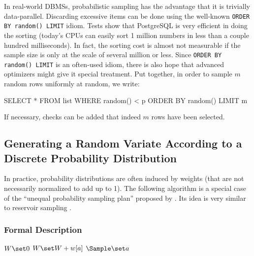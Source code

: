 In real-world DBMSs, probabilistic sampling has the advantage that it is trivially data-parallel. Discarding excessive items can be done using the well-known \texttt{ORDER BY random() LIMIT} idiom. Tests show that PostgreSQL is very efficient in doing the sorting (today's CPUs can easily sort 1 million numbers in less than a couple hundred milliseconds). In fact, the sorting cost is almost not measurable if the sample size is only at the scale of several million or less. Since \texttt{ORDER BY random() LIMIT} is an often-used idiom, there is also hope that advanced optimizers might give it special treatment. Put together, in order to sample $m$ random rows uniformly at random, we write:
\begin{sql}
	SELECT * FROM list WHERE random() < p ORDER BY random() LIMIT m
\end{sql}
If necessary, checks can be added that indeed $m$ rows have been selected.


\subsection{Generating a Random Variate According to a Discrete Probability Distribution}

In practice, probability distributions are often induced by weights (that are not necessarily normalized to add up to 1). The following algorithm is a special case of the ``unequal probability sampling plan'' proposed by \textcite{C82a}. Its idea is very similar to reservoir sampling \cite{MB83a}.

\subsubsection{Formal Description}

\begin{algorithm}[WeightedSample$(A, w)$] \label{alg:WeightedSample}
\begin{algorithmic}[1]
	\State $W \set 0$
		\State $W \set W + w[a]$ \label{alg:WeightedSample:UpdateWeight}
		 \label{alg:WeightedSample:Prob}
			\State $\Sample \set a$ \label{alg:WeightedSample:SetSample}
		\EndWith
	\EndFor
\end{algorithmic}
\end{algorithm}

